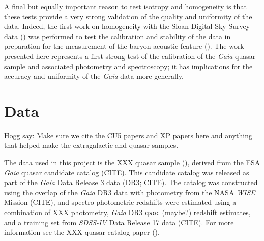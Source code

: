 \documentclass[modern]{aastex631}
\begin{document}
A final but equally important reason to test isotropy and homogeneity is that these tests provide a very strong validation of the quality and uniformity of the data.
Indeed, the first work on homogeneity with the Sloan Digital Sky Survey data (\citealt{hogg05}) was performed to test the calibration and stability of the data in preparation for the measurement of the baryon acoustic feature (\citealt{baf}).
The work presented here represents a first strong test of the calibration of the \textsl{Gaia} quasar sample and associated photometry and spectroscopy; it has implications for the accuracy and uniformity of the \textsl{Gaia} data more generally.

\section{Data}\label{sec:data}\noindent
Hogg say: Make sure we cite the CU5 papers and XP papers here and anything that helped make the extragalactic and quasar samples.

The data used in this project is the XXX quasar sample (\citealt{ksf}), derived from the ESA \textsl{Gaia} quasar candidate catalog (CITE).
This candidate catalog was released as part of the \textsl{Gaia} Data Release 3 data (DR3; CITE).
The catalog was constructed using the overlap of the \textsl{Gaia} DR3 data with photometry from the NASA \textsl{WISE} Mission (CITE), and spectro-photometric redshifts were estimated using a combination of XXX photometry, \textsl{Gaia} DR3 \texttt{qsoc} (maybe?) redshift estimates, and a training set from \textsl{SDSS-IV} Data Release 17 data (CITE).
For more information see the XXX quasar catalog paper (\citealt{ksf}).
\end{document}
